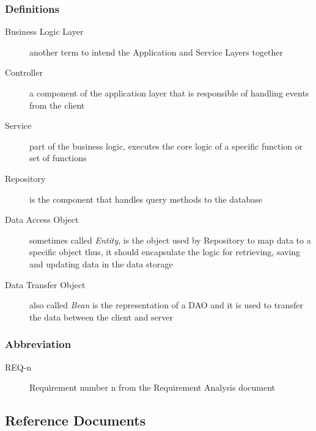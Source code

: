\documentclass[a4paper]{article}
\begin{document}
            \subsubsection{Definitions}
            \begin{description}
                 \item[Business Logic Layer] another term to intend the Application and Service Layers together
                 \item[Controller] a component of the application layer that is responsible of handling events from the client
                 \item[Service] part of the business logic, executes the core logic of a specific function or set of functions
                 \item[Repository] is the component that handles query methods to the database
                 \item[Data Access Object] sometimes called \textit{Entity}, is the object used by Repository to map data to a specific object thus, it should encapsulate the logic for retrieving, saving and updating data in the data storage
                 \item[Data Transfer Object] also called \textit{Bean} is the representation of a DAO and it is used to transfer the data between the client and server
            \end{description}
            
            \subsubsection{Abbreviation}
            \begin{description}
                \item[REQ-n] Requirement number n from the Requirement Analysis document
            \end{description}
            
\subsection{Reference Documents}
\printbibliography[heading=none]

\end{document}
